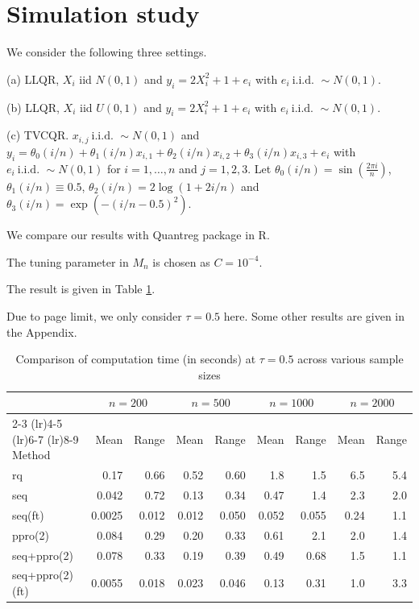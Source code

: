 \documentclass[lineno]{biometrika}
\begin{document}
\section{Simulation study}

We consider the following three settings.

(a) LLQR, $X_i$ iid $N(0,1)$ and $y_i=2X_i^2 +1+e_i$ with $e_i\ \text{i.i.d. }\sim N(0,1)$. 

(b) LLQR, $X_i$ iid $U(0,1)$ and $y_i=2X_i^2 +1+e_i$ with $e_i\ \text{i.i.d. }\sim N(0,1)$.

(c) TVCQR. $x_{i,j}\ \text{i.i.d. }\sim N(0,1)$ and $y_i=\theta_0(i/n)+\theta_1(i/n)x_{i,1}+\theta_2(i/n)x_{i,2}+\theta_3(i/n)x_{i,3}+e_i$ with $e_i\ \text{i.i.d. }\sim N(0,1)$ for $i=1,\ldots,n$ and $j=1,2,3$. Let $\theta_0(i/n)=\sin(\frac{2\pi i}{n})$, $\theta_1(i/n)\equiv 0.5$, $\theta_2(i/n)=2\log (1+2i/n)$ and $\theta_3(i/n)=\exp(-(i/n-0.5)^2)$. 

We compare our results with Quantreg package in R.

The tuning parameter in $M_n$ is chosen as $C=10^{-4}$.

The result is given in Table \ref{tab:simu_tau05}.

Due to page limit, we only consider $\tau=0.5$ here. Some other results are given in the Appendix.



\begin{table}[htbp]
	\centering
	\caption{Comparison of computation time (in seconds) at $\tau=0.5$ across various sample sizes}
	\begin{tabular}{lrrrrrrrr}
		\toprule
		& \multicolumn{2}{c}{$n=200$} & \multicolumn{2}{c}{$n=500$} & \multicolumn{2}{c}{$n=1000$} & \multicolumn{2}{c}{$n=2000$} \\
		\cmidrule(lr){2-3} \cmidrule(lr){4-5} \cmidrule(lr){6-7} \cmidrule(lr){8-9}
		Method & Mean & Range & Mean & Range & Mean & Range & Mean & Range \\
		\midrule
		rq & 0.17 & 0.66 & 0.52 & 0.60 & 1.8 & 1.5 & 6.5 & 5.4 \\
		seq & 0.042 & 0.72 & 0.13 & 0.34 & 0.47 & 1.4 & 2.3 & 2.0 \\
		seq(ft) & 0.0025 & 0.012 & 0.012 & 0.050 & 0.052 & 0.055 & 0.24 & 1.1 \\
		ppro(2) & 0.084 & 0.29 & 0.20 & 0.33 & 0.61 & 2.1 & 2.0 & 1.4 \\
		seq+ppro(2) & 0.078 & 0.33 & 0.19 & 0.39 & 0.49 & 0.68 & 1.5 & 1.1 \\
		seq+ppro(2)(ft) & 0.0055 & 0.018 & 0.023 & 0.046 & 0.13 & 0.31 & 1.0 & 3.3 \\
		\bottomrule
	\end{tabular}
	\label{tab:simu_tau05}
\end{table}
 
\end{document}
